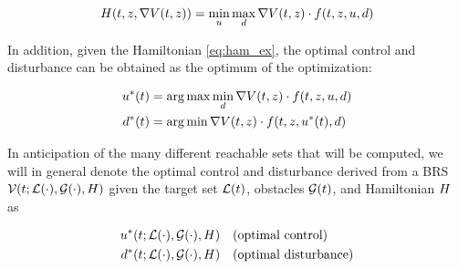 \begin{equation}
\label{eq:ham_ex}
\begin{aligned}
\ham(t, \state, \nabla \valfunc(t,\state)) = \min_\ctrl \max_\dstb \nabla \valfunc(t,\state) \cdot \fdyn(t, \state, \ctrl, \dstb)
\end{aligned}
\end{equation}

In addition, given the Hamiltonian \eqref{eq:ham_ex}, the optimal control and disturbance can be obtained as the optimum of the optimization:

\begin{equation}
\label{eq:opt_ctrl_dstb_ex}
\begin{aligned}
\ctrl^*(t) &= \arg \max \min_\dstb \nabla \valfunc(t,\state) \cdot \fdyn(t, \state, \ctrl, \dstb)\\
\dstb^*(t) &= \arg \min \nabla \valfunc(t,\state) \cdot \fdyn(t, \state, \ctrl^*(t), \dstb)
\end{aligned}
\end{equation}

In anticipation of the many different reachable sets that will be computed, we will in general denote the optimal control and disturbance derived from a BRS $\mathcal{V}(t; \mathcal{L}(\cdot), \mathcal{G}(\cdot), H)$ given the target set $\mathcal{L}(t)$, obstacles $\mathcal{G}(t)$, and Hamiltonian $H$ as 

\begin{equation}
\label{eq:opt_ctrl}
\begin{aligned}
\ctrl^*(t; \targetset(\cdot), \obsset(\cdot), \ham) &\quad \text{(optimal control)} \\
\dstb^*(t; \targetset(\cdot), \obsset(\cdot), \ham) &\quad \text{(optimal disturbance)}
\end{aligned}
\end{equation}

